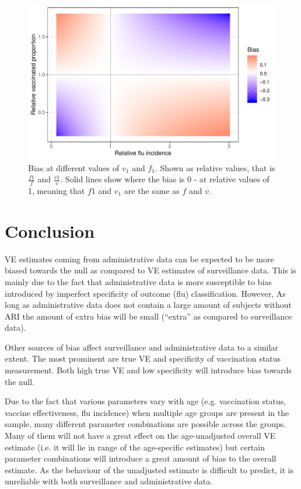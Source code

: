\documentclass[11pt]{article}
\begin{document}
\begin{figure}[h]
	\centering
		\includegraphics[width=1\linewidth]{../fig-fvinv//fig-fvinv.pdf}
		\caption{
Bias at different values of $v_1$ and $f_1$. Shown as relative values, that is $\frac{f1}{f}$ and $\frac{v1}{v}$. Solid lines show where the bias is 0 - at relative values of 1, meaning that $f1$ and $v_1$ are the same as $f$ and $v$. \label{fig:fvinv}
		}
\end{figure}

\pagebreak
%
\section{Conclusion}

VE estimates coming from administrative data can be expected to be more biased towards the null as compared to VE estimates of surveillance data. This is mainly due to the fact that administrative data is more susceptible to bias introduced by imperfect specificity of outcome (flu) classification. However, As long as administrative data does not contain a large amount of subjects without ARI the amount of extra bias will be small (``extra'' as compared to surveillance data).

Other sources of bias affect surveillance and administrative data to a similar extent. The most prominent are true VE and specificity of vaccination status measurement. Both high true VE and low specificity will introduce bias towards the null. 

Due to the fact that various parameters vary with age (e.g. vaccination status, vaccine effectiveness, flu incidence) when multiple age groups are present in the sample, many different parameter combinations are possible across the groups. Many of them will not have a great effect on the age-unadjusted overall VE estimate (i.e. it will lie in range of the age-specific estimates) but certain parameter combinations will introduce a great amount of bias to the overall estimate. As the behaviour of the unadjusted estimate is difficult to predict, it is unreliable with both surveillance and administrative data.

\pagebreak
\thispagestyle{plain}

\end{document}

